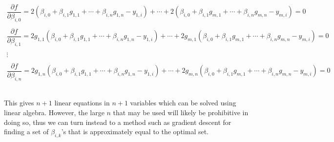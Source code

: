 \documentclass[12pt]{amsart}
\theoremstyle{plain}
\theoremstyle{definition}
\begin{document}
\[\begin{array}{c}
\dfrac{\partial f}{\partial {\beta_{i,0}}} = 2(\beta_{i,0} + \beta_{i,1}g_{1,1}+\cdots+\beta_{i,n}g_{1,n} - y_{1,i}) + \cdots + 2(\beta_{i,0} + \beta_{i,1}g_{m,1}+\cdots+\beta_{i,n}g_{m,n} - y_{m,i}) = 0 \\\\
\dfrac{\partial f}{\partial {\beta_{i,1}}} = 2g_{1,1}(\beta_{i,0} + \beta_{i,1}g_{1,1}+\cdots+\beta_{i,n}g_{1,n} - y_{1,i}) + \cdots + 2g_{m,1}(\beta_{i,0} + \beta_{i,1}g_{m,1}+\cdots+\beta_{i,n}g_{m,n} - y_{m,i}) = 0 \\\\
\vdots\\\\
\dfrac{\partial f}{\partial {\beta_{i,n}}} = 2g_{1,n}(\beta_{i,0} + \beta_{i,1}g_{1,1}+\cdots+\beta_{i,n}g_{1,n} - y_{1,i}) + \cdots + 2g_{m,n}(\beta_{i,0} + \beta_{i,1}g_{m,1}+\cdots+\beta_{i,n}g_{m,n} - y_{m,i}) = 0 \\\\
\end{array} \]\\

This gives $n+1$ linear equations in $n+1$ variables which can be solved using linear algebra.
However, the large $n$ that may be used will likely be prohibitive in doing so, thus we can turn instead to a method such as gradient descent for finding a set of $\beta_{i,k}$'s that is approximately equal to the optimal set.

\end{document}
